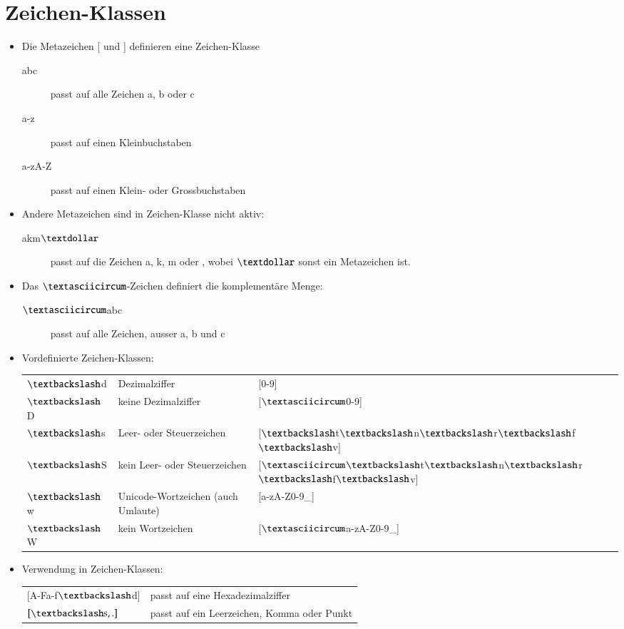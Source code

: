 \section{Zeichen-Klassen}
\begin{itemize}
	\item Die Metazeichen [ und ] definieren eine Zeichen-Klasse
	\begin{description}
		\item[abc] passt auf alle Zeichen a, b oder c
		\item[a-z] passt auf einen Kleinbuchstaben
		\item[a-zA-Z] passt auf einen Klein- oder Grossbuchstaben
	\end{description}
	\item Andere Metazeichen sind in Zeichen-Klasse nicht aktiv:
	\begin{description}
		\item[akm$\textdollar$] passt auf die Zeichen a, k, m oder \textdollar, wobei $\textdollar$ sonst ein Metazeichen ist. 
	\end{description}
	\item Das $\textasciicircum$-Zeichen definiert die komplementäre Menge:
	\begin{description}
		\item[$\textasciicircum$abc] passt auf alle Zeichen, ausser a, b und c
	\end{description}
	\item Vordefinierte Zeichen-Klassen:\\
	\begin{tabular}{lll}
		$\textbackslash$d& Dezimalziffer& [0-9]\\ 
		$\textbackslash$D& keine Dezimalziffer& [$\textasciicircum$0-9]\\ 
		$\textbackslash$s& Leer- oder Steuerzeichen& [$\textbackslash$t$\textbackslash$n$\textbackslash$r$\textbackslash$f$\textbackslash$v]\\ 
		$\textbackslash$S& kein Leer- oder Steuerzeichen& [$\textasciicircum$$\textbackslash$t$\textbackslash$n$\textbackslash$r$\textbackslash$f$\textbackslash$v]\\ 
		$\textbackslash$w& Unicode-Wortzeichen (auch Umlaute)& [a-zA-Z0-9\_]\\ 
		$\textbackslash$W& kein Wortzeichen& [$\textasciicircum$a-zA-Z0-9\_]\\ 
	\end{tabular}
	\item Verwendung in Zeichen-Klassen:\\
	\begin{tabular}{ll}
		[A-Fa-f$\textbackslash$d]& passt auf eine Hexadezimalziffer\\
		$[\textbackslash s,.]$& passt auf ein Leerzeichen, Komma oder Punkt\\
	\end{tabular}
\end{itemize}

